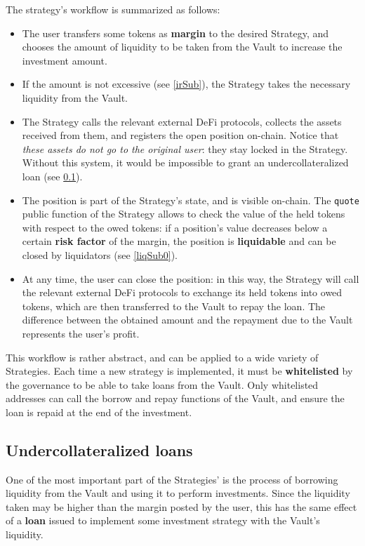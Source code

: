 \documentclass[a4paper,10 pt]{article}
\theoremstyle{definition}
\begin{document}
The strategy's workflow is summarized as follows:
\begin{itemize}
\item The user transfers some tokens as {\bf margin} to the desired Strategy, and chooses the amount of liquidity to be taken from the Vault to increase the investment amount.
\item If the amount is not excessive (see \ref{irSub}), the Strategy takes the necessary liquidity from the Vault.
\item The Strategy calls the relevant external DeFi protocols, collects the assets received from them, and registers the open position on-chain. Notice that {\it these assets do not go to the original user}: they stay locked in the Strategy. Without this system, it would be impossible to grant an undercollateralized loan (see \ref{ulSub}).
\item The position is part of the Strategy's state, and is visible on-chain. The \verb|quote| public function of the Strategy allows to check the value of the held tokens with respect to the owed tokens: if a position's value decreases below a certain {\bf risk factor} of the margin, the position is {\bf liquidable} and can be closed by liquidators (see \ref{liqSub0}).
\item At any time, the user can close the position: in this way, the Strategy will call the relevant external DeFi protocols to exchange its held tokens into owed tokens, which are then transferred to the Vault to repay the loan. The difference between the obtained amount and the repayment due to the Vault represents the user's profit.
\end{itemize} 

This workflow is rather abstract, and can be applied to a wide variety of Strategies. Each time a new strategy is implemented, it must be {\bf whitelisted} by the governance to be able to take loans from the Vault.
Only whitelisted addresses can call the borrow and repay functions of the Vault, and ensure the loan is repaid at the end of the investment.

\subsection{Undercollateralized loans}\label{ulSub}

One of the most important part of the Strategies' is the process of borrowing liquidity from the Vault and using it to perform investments. Since the liquidity taken may be higher than the margin posted by the user, this has the same effect of a {\bf loan} issued to implement some investment strategy with the Vault's liquidity.
\end{document}
